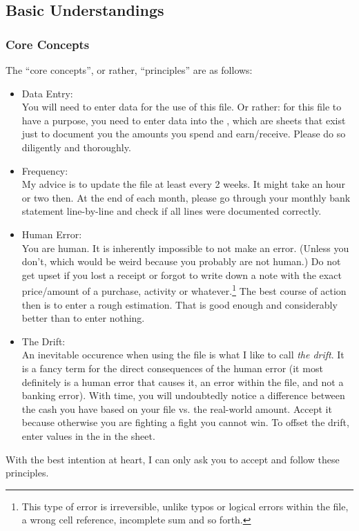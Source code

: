 \subsection{Basic Understandings}
\label{subsec:basic-understandings}

\subsubsection{Core Concepts}
\label{subsubsec:core-concepts}

The ``core concepts'', or rather, ``principles'' are as follows:
\begin{itemize}
	\item Data Entry:\\
	You will need to enter data for the use of this file.
	Or rather: for this file to have a purpose, you need to enter data into the , which are sheets that exist just to document you the amounts you spend and earn/receive.
	Please do so diligently and thoroughly.
	\item Frequency:\\
	My advice is to update the file at least every 2 weeks.
	It might take an hour or two then.
	At the end of each month, please go through your monthly bank statement line-by-line and check if all lines were documented correctly.
	\item Human Error:\\
	You are human.
	It is inherently impossible to not make an error.
	(Unless you don't, which would be weird because you probably are not human.)
	Do not get upset if you lost a receipt or forgot to write down a note with the exact price/amount of a purchase, activity or whatever.\footnote{This type of error is irreversible, unlike typos or logical errors within the file, \eg a wrong cell reference, incomplete sum and so forth.}
	The best course of action then is to enter a rough estimation.
	That is good enough and considerably better than to enter nothing.
	\item The Drift:\\
	An inevitable occurence when using the file is what I like to call \emph{the drift}.
	It is a fancy term for the direct consequences of the human error (it most definitely is a human error that causes it, \ie an error within the file, and not a banking error).
	With time, you will undoubtedly notice a difference between the cash you have based on your file vs. the real-world amount.
	Accept it because otherwise you are fighting a fight you cannot win.
	To offset the drift, enter values in the  in the  sheet.
\end{itemize}
With the best intention at heart, I can only ask you to accept and follow these principles.

